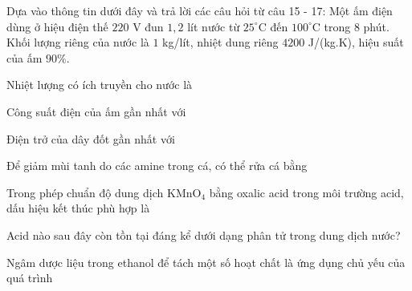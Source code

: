 \begin{baidoc}
\item[] Dựa vào thông tin dưới đây và trả lời các câu hỏi từ câu 15 - 17:
Một ấm điện dùng ở hiệu điện thế $220$ V đun $1{,}2$ lít nước từ $25^\circ$C đến $100^\circ$C trong $8$ phút. Khối lượng riêng của nước là $1$ kg/lít, nhiệt dung riêng $4200$ J/(kg.K), hiệu suất của ấm $90\%$.

\begin{ex}
Nhiệt lượng có ích truyền cho nước là
\end{ex}

\begin{ex}
Công suất điện của ấm gần nhất với
\end{ex}

\begin{ex}
Điện trở của dây đốt gần nhất với
\end{ex}
\end{baidoc}


\begin{ex}
Để giảm mùi tanh do các amine trong cá, có thể rửa cá bằng
\end{ex}

\begin{ex}
Trong phép chuẩn độ dung dịch $\mathrm{KMnO_4}$ bằng oxalic acid trong môi trường acid, dấu hiệu kết thúc phù hợp là
\end{ex}

\begin{ex}
Acid nào sau đây còn tồn tại đáng kể dưới dạng phân tử trong dung dịch nước?
\end{ex}

\begin{ex}
Ngâm dược liệu trong ethanol để tách một số hoạt chất là ứng dụng chủ yếu của quá trình
\end{ex}

